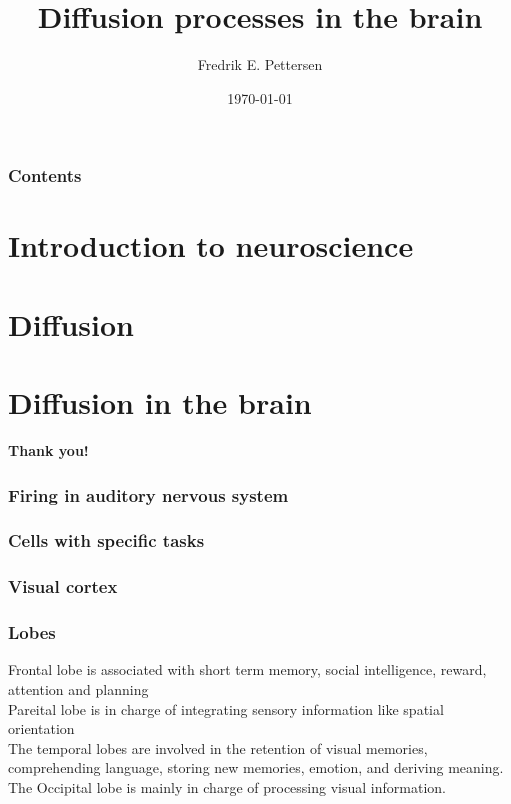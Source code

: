 \documentclass{beamer}
\title[Presentation - Kongsberg Defence \& Aerospace]{Diffusion processes in the brain}
\author{Fredrik E. Pettersen}
\date{\today}
\begin{document}
\begin{frame}
\titlepage
\end{frame}



\begin{frame}
 \frametitle{Contents}
 \tableofcontents[hideallsubsections]
\end{frame}

\section{Introduction to neuroscience}



\section{Diffusion}



\section{Diffusion in the brain}



\begin{frame}
\begin{center}
 \textbf{Thank you!}
\end{center}
\end{frame}





\begin{frame}
 \frametitle{Firing in auditory nervous system}
\end{frame}


\begin{frame}
\frametitle{Cells with specific tasks}

\end{frame}

\begin{frame}
\frametitle{Visual cortex}
\end{frame}

\begin{frame}
 \frametitle{Lobes}
 Frontal lobe is associated with short term memory, social intelligence, reward, attention and planning\\
 Pareital lobe is in charge of integrating sensory information like spatial orientation\\
 The temporal lobes are involved in the retention of visual memories, comprehending language, storing new memories, emotion, and deriving meaning.\\
 The Occipital lobe is mainly in charge of processing visual information.
\end{frame}
\end{document}
